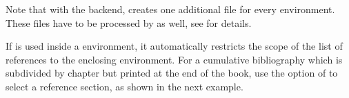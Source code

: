 \BibTeXOnlyMark Note that with the \bibtex backend, \biblatex creates one additional  file for every  environment. These files have to be processed by \bibtex as well, see  for details.

%
If  is used inside a  environment, it automatically restricts the scope of the list of references to the enclosing  environment. For a cumulative bibliography which is subdivided by chapter but printed at the end of the book, use the  option of  to select a reference section, as shown in the next example.

